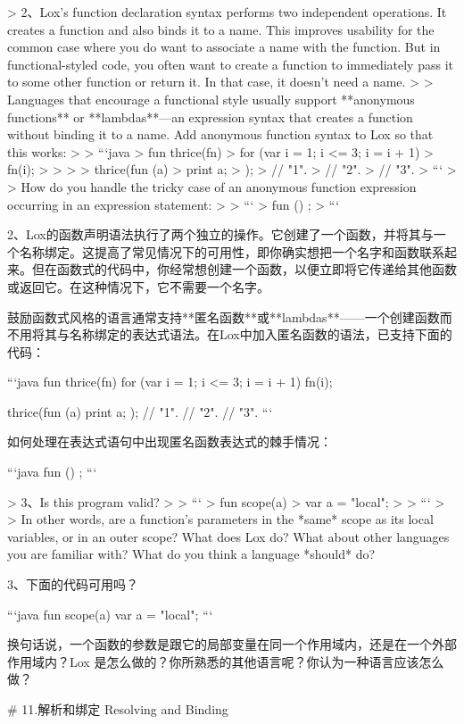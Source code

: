 \documentclass[cn,11pt,chinese]{elegantbook}
\begin{document}
{{{{{{{{{{{{> 2、Lox’s function declaration syntax performs two independent operations. It creates a function and also binds it to a name. This improves usability for the common case where you do want to associate a name with the function. But in functional-styled code, you often want to create a function to immediately pass it to some other function or return it. In that case, it doesn’t need a name.
>
> Languages that encourage a functional style usually support **anonymous functions** or **lambdas**—an expression syntax that creates a function without binding it to a name. Add anonymous function syntax to Lox so that this works:
>
> ```java
> fun thrice(fn) {
>   for (var i = 1; i <= 3; i = i + 1) {
>     fn(i);
>   }
> }
> 
> thrice(fun (a) {
>   print a;
> });
> // "1".
> // "2".
> // "3".
> ```
>
> How do you handle the tricky case of an anonymous function expression occurring in an expression statement:
>
> ```
> fun () {};
> ```

2、Lox的函数声明语法执行了两个独立的操作。它创建了一个函数，并将其与一个名称绑定。这提高了常见情况下的可用性，即你确实想把一个名字和函数联系起来。但在函数式的代码中，你经常想创建一个函数，以便立即将它传递给其他函数或返回它。在这种情况下，它不需要一个名字。

鼓励函数式风格的语言通常支持**匿名函数**或**lambdas**——一个创建函数而不用将其与名称绑定的表达式语法。在Lox中加入匿名函数的语法，已支持下面的代码：

```java
fun thrice(fn) {
  for (var i = 1; i <= 3; i = i + 1) {
    fn(i);
  }
}

thrice(fun (a) {
  print a;
});
// "1".
// "2".
// "3".
```

如何处理在表达式语句中出现匿名函数表达式的棘手情况：

```java
fun () {};
```

> 3、Is this program valid?
>
> ```
> fun scope(a) {
>   var a = "local";
> }
> ```
>
> In other words, are a function’s parameters in the *same* scope as its local variables, or in an outer scope? What does Lox do? What about other languages you are familiar with? What do you think a language *should* do?

3、下面的代码可用吗？

```java
fun scope(a) {
  var a = "local";
}
```

换句话说，一个函数的参数是跟它的局部变量在同一个作用域内，还是在一个外部作用域内？Lox 是怎么做的？你所熟悉的其他语言呢？你认为一种语言应该怎么做？

# 11.解析和绑定 Resolving and Binding

}}}}}}}}}}}}
\end{document}
